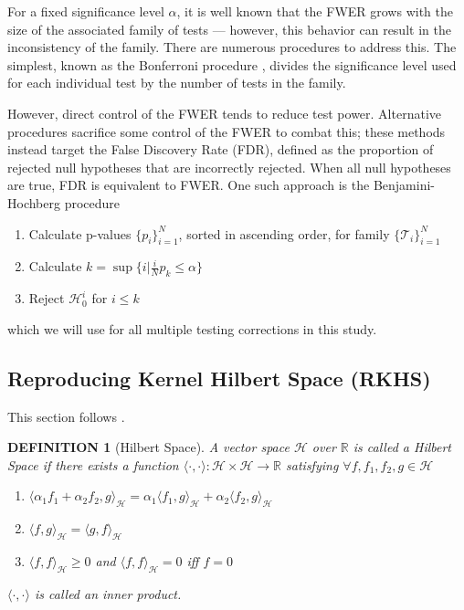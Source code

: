 \documentclass[a4paper,11pt]{article}
\newtheorem{definition}[theorem]{DEFINITION}
\begin{document}
For a fixed significance level $\alpha$, it is well known that the FWER grows with the size of the associated family of tests --- however, this behavior can result in the inconsistency of the family. There are numerous procedures to address this. The simplest, known as the Bonferroni procedure \cite{bonferroni_il_nodate}, divides the significance level used for each individual test by the number of tests in the family. 

However, direct control of the FWER tends to reduce test power. Alternative procedures sacrifice some control of the FWER to combat this; these methods instead target the False Discovery Rate (FDR), defined as the proportion of rejected null hypotheses that are incorrectly rejected. When all null hypotheses are true, FDR is equivalent to FWER. One such approach is the Benjamini-Hochberg procedure \cite{benjamini_controlling_1995}

\begin{enumerate}
    \item Calculate p-values $\{p_{i}\}_{i=1}^{N}$, sorted in ascending order, for family $\{\mathcal{T}_{i}\}_{i=1}^{N}$
    \item Calculate $k = \sup \{i | \frac{i}{N} p_{k} \leq \alpha \} $
    \item Reject $\mathcal{H}_{0}^{i}$ for $i \leq k$
\end{enumerate}
which we will use for all multiple testing corrections in this study.

\subsection{Reproducing Kernel Hilbert Space (RKHS)}
This section follows \cite{steinwart_support_2008}.

\begin{definition}[Hilbert Space]
    A vector space $\mathcal{H}$ over $\mathbb{R}$ is called a Hilbert Space if there exists a function $\langle \cdot, \cdot \rangle: \mathcal{H} \times \mathcal{H} \rightarrow \mathbb{R} $ satisfying $\forall f, f_{1}, f_{2},  g \in \mathcal{H}$
    \begin{enumerate}
        \item $\langle\alpha_{1} f_{1}+\alpha_{2} f_{2}, g\rangle_{\mathcal{H}}=\alpha_{1}\langle f_{1}, g\rangle_{\mathcal{H}}+\alpha_{2}\langle f_{2}, g\rangle_{\mathcal{H}}$ 
        \item $\langle f, g\rangle_{\mathcal{H}}=\langle g, f\rangle_{\mathcal{H}}$
        \item $\langle f, f\rangle_{\mathcal{H}} \geq 0$ and $\langle f, f\rangle_{\mathcal{H}}=0$ iff $f=0$
    \end{enumerate}
     $\langle \cdot, \cdot \rangle$ is called an inner product.
    \label{def:hilbert_space}
\end{definition}
\end{document}
